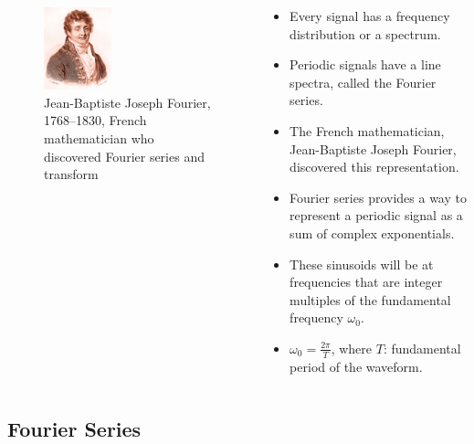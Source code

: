 \begin{frame}
    \begin{columns}[t]
        \begin{column}{0.4\textwidth}
            \begin{figure}
              \centering
              \includegraphics[width=0.4\textwidth]{figures/fourier.jpg}
              \caption{Jean-Baptiste Joseph Fourier, 1768--1830, French mathematician who discovered Fourier series and transform}\label{fi:secb_fourier}
            \end{figure}
        \end{column}
        \begin{column}{0.6\textwidth}
            \begin{itemize}[<+->]
              \item Every signal has a frequency distribution or a \alert{spectrum}.
              \item Periodic signals have a line spectra, called the Fourier series.
              \item The French mathematician, Jean-Baptiste Joseph Fourier, discovered this representation.
              \item Fourier series provides a way  to represent a periodic signal as a sum of complex exponentials.
              \item These sinusoids will be at frequencies that are integer multiples of the fundamental frequency $\omega_0$.
              \item $\omega_0 = \frac{2\pi}{T}$, where $T$: fundamental period of the waveform.
            \end{itemize}
        \end{column}
    \end{columns}
\end{frame}

\subsection{Fourier Series}

